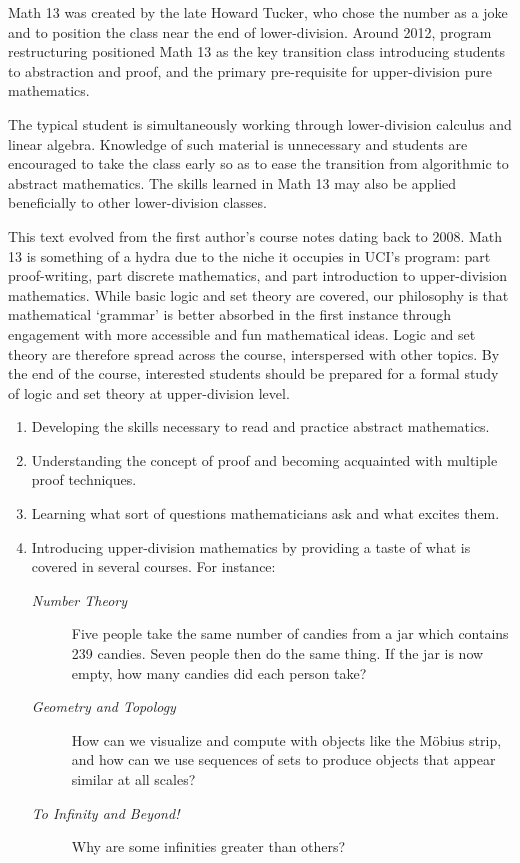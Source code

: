 Math 13 was created by the late Howard Tucker, who chose the number as a joke and to position the class near the end of lower-division. Around 2012, program restructuring positioned Math 13 as the key transition class introducing students to abstraction and proof, and the primary pre-requisite for upper-division pure mathematics.\smallbreak

The typical student is simultaneously working through lower-division calculus and linear algebra. Knowledge of such material is unnecessary and students are encouraged to take the class early so as to ease the transition from algorithmic to abstract mathematics. The skills learned in Math 13 may also be applied beneficially to other lower-division classes.\smallbreak

This text evolved from the first author's course notes dating back to 2008. Math 13 is something of a hydra due to the niche it occupies in UCI's program: part proof-writing, part discrete mathematics, and part introduction to upper-division mathematics. While basic logic and set theory are covered, our philosophy is that mathematical `grammar' is better absorbed in the first instance through engagement with more accessible and fun mathematical ideas. Logic and set theory are therefore spread across the course, interspersed with other topics. By the end of the course, interested students should be prepared for a formal study of logic and set theory at upper-division level.



\begin{enumerate}
	\item Developing the skills necessary to read and practice abstract mathematics.
	\item Understanding the concept of proof and becoming acquainted with multiple proof techniques.
	\item Learning what sort of questions mathematicians ask and what excites them.
	\item Introducing upper-division mathematics by providing a taste of what is covered in several courses. For instance:
	\begin{description}
		\item[\normalfont\emph{Number Theory}] Five people take the same number of candies from a jar which contains 239 candies. Seven people then do the same thing. If the jar is now empty, how many candies did each person take?
		\item[\normalfont\emph{Geometry and Topology}] How can we visualize and compute with objects like the Möbius strip, and how can we use sequences of sets to produce objects that appear similar at all scales?
		\item[\normalfont\emph{To Infinity and Beyond!}] Why are some infinities greater than others?
	\end{description}
\end{enumerate}


